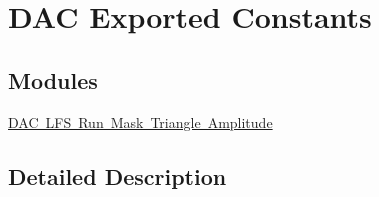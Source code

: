 \hypertarget{group___d_a_c_ex___exported___constants}{}\section{D\+AC Exported Constants}
\label{group___d_a_c_ex___exported___constants}
\subsection*{Modules}
\begin{DoxyCompactItemize}
\item 
\mbox{\hyperlink{group___d_a_c_ex__lfsrunmask__triangleamplitude}{D\+A\+C L\+F\+S Run Mask Triangle Amplitude}}
\end{DoxyCompactItemize}


\subsection{Detailed Description}
